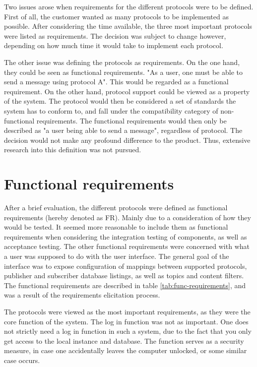 Two issues arose when requirements for the different protocols were to be defined. First of all, the customer wanted as many protocols to be implemented as possible. After considering the time available, the three most important protocols were listed as requirements. The decision was subject to change however, depending on how much time it would take to implement each protocol.

The other issue was defining the protocols as requirements. On the one hand, they could be seen as functional requirements. "As a user, one must be able to send a message using protocol A". This would be regarded as a functional requirement. On the other hand, protocol support could be viewed as a property of the system. The protocol would then be considered a set of standards the system has to conform to, and fall under the compatibility category of non-functional requirements. The functional requirements would then only be described as "a user being able to send a message", regardless of protocol. The decision would not make any profound difference to the product. Thus, extensive research into this definition was not pursued.

\section{Functional requirements}
\label{sec:requirements_engineering-functional_requirements}

After a brief evaluation, the different protocols were defined as functional requirements (hereby denoted as FR). Mainly due to a consideration of how they would be tested. It seemed more reasonable to include them as functional requirements when considering the integration testing of components, as well as acceptance testing. The other functional requirements were concerned with what a user was supposed to do with the user interface. The general goal of the interface was to expose configuration of mappings between supported protocols, publisher and subscriber database listings, as well as topics and content filters. The functional requirements are described in table \ref{tab:func-requirements}, and was a result of the requirements elicitation process.

The protocols were viewed as the most important requirements, as they were the core function of the system. The log in function was not as important. One does not strictly need a log in function in such a system, due to the fact that you only get access to the local instance and database. The function serves as a security measure, in case one accidentally leaves the computer unlocked, or some similar case occurs.

